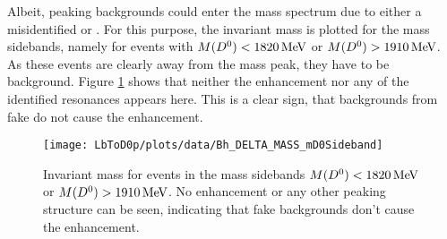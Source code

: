 Albeit, peaking backgrounds could enter the \Dz\proton mass spectrum due to either a misidentified \Dz or \proton.
For this purpose, the invariant \Dz\proton mass is plotted for the \Dz mass sidebands, namely for events with $M({{D}^0}) < 1820 \mathrm{\,Me\kern -0.1em V}$ or $M({{D}^0}) > 1910 \mathrm{\,Me\kern -0.1em V}$.
As these events are clearly away from the \Dz mass peak, they have to be background.
Figure \ref{fig:plot_mD0p_mD0Sideband} shows that neither the enhancement nor any of the identified \Lc resonances appears here.
This is a clear sign, that backgrounds from fake \Dz do not cause the enhancement.
\begin{figure}[tb]
	\centering
	\texttt{[image: LbToD0p/plots/data/Bh\_DELTA\_MASS\_mD0Sideband]}
	\caption{Invariant \Dz\proton mass for events in the \Dz mass sidebands $M({{D}^0}) < 1820 \mathrm{\,Me\kern -0.1em V}$ or $M({{D}^0}) > 1910 \mathrm{\,Me\kern -0.1em V}$. No enhancement or any other peaking structure can be seen, indicating that fake \Dz backgrounds don't cause the enhancement.}
	\label{fig:plot_mD0p_mD0Sideband}
\end{figure}

